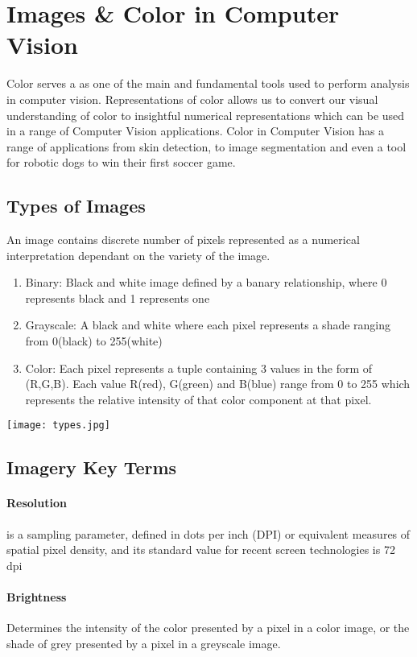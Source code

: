 \documentclass{article}
\begin{document}
\section{Images \& Color in Computer Vision}

Color serves a as one of the main and fundamental tools used to perform analysis in computer vision. Representations of color allows us to convert our visual understanding of color to insightful numerical representations which can be used in a range of Computer Vision applications. Color in Computer Vision has a range of applications from skin detection, to image segmentation and even a tool for robotic dogs to win their first soccer game.

\subsection{Types of Images}
An image contains discrete number of pixels represented as a numerical interpretation dependant on the variety of the image.

\begin{enumerate}
    \item Binary: Black and white image  defined by a banary relationship, where 0 represents black and 1 represents one
    \item Grayscale: A black and white where each pixel represents a shade ranging from 0(black) to 255(white)
   
    \item Color: Each pixel represents a tuple containing 3 values in the form of (R,G,B). Each value R(red), G(green) and B(blue) range from 0 to 255 which represents the relative intensity of that color component at that pixel. 
    \end{enumerate}{}
    
    \texttt{[image: types.jpg]}
\subsection{Imagery Key Terms}
\paragraph{Resolution} is a sampling parameter, defined in dots per inch (DPI) or equivalent measures of spatial pixel density, and its standard value for recent screen technologies is 72 dpi

\paragraph{Brightness} Determines the intensity of the color presented by a pixel in a color image, or the shade of grey presented by a pixel in a greyscale image.
\end{document}
